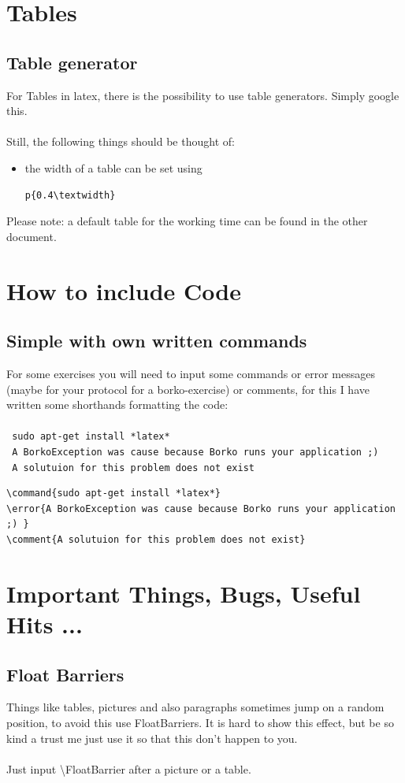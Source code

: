 \documentclass[12pt]{article}
\newcommand{\command}[1]{{\texttt{\color{blue} #1\\}}}
\newcommand{\error}[1]{{\texttt{\color{red} #1\\}}}
\newcommand{\comment}[1]{{\texttt{\color{OliveGreen} #1\\}}}
\begin{document}
\newpage
\section{Tables}
\subsection{Table generator}
For Tables in latex, there is the possibility to use table generators. Simply google this.
\\ \\
Still, the following things should be thought of:
\\
\begin{itemize}
\item the width of a table can be set using 
\begin{lstlisting}
p{0.4\textwidth}
\end{lstlisting}
\end{itemize}

Please note: a default table for the working time can be found in the other document.


\newpage
\section{How to include Code}
\subsection{Simple with own written commands}
For some exercises you will need to input some commands or error messages (maybe for your protocol for a borko-exercise) or comments, for this I have written some shorthands formatting the code:\\\\
\command{sudo apt-get install *latex*}
\error{A BorkoException was cause because Borko runs your application ;) }
\comment{A solutuion for this problem does not exist}
\begin{lstlisting}
\command{sudo apt-get install *latex*}
\error{A BorkoException was cause because Borko runs your application ;) }
\comment{A solutuion for this problem does not exist}
\end{lstlisting}

\newpage
\section{Important Things, Bugs, Useful Hits ...}
\subsection{Float Barriers}
Things like tables, pictures and also paragraphs sometimes jump on a random position, to avoid this use FloatBarriers. It is hard to show this effect, but be so kind a trust me just use it so that this don't happen to you.\\\\
Just input \textbackslash{}FloatBarrier after a picture or a table.
\end{document}
